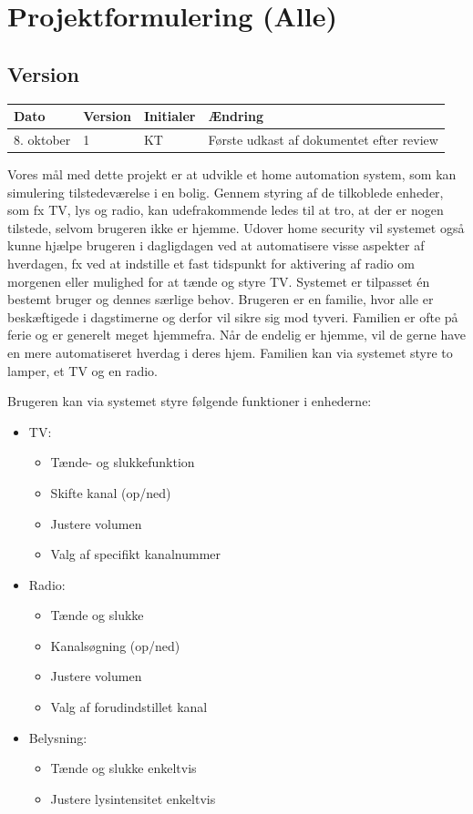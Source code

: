 \chapter{Projektformulering (Alle)}

\section{Version}
\begin{table}[h]
	\centering
	\begin{tabularx}{\textwidth}{|l|l| l|X|}
	\hline
	Dato	& Version	& Initialer & Ændring	\\ \hline
	8. oktober & 1 & KT	& Første udkast af dokumentet efter review \\ \hline
	\end{tabularx}
\end{table}

Vores mål med dette projekt er at udvikle et home automation system, som kan simulering tilstedeværelse i en bolig. Gennem styring af de tilkoblede enheder, som fx TV, lys og radio, kan udefrakommende ledes til at tro, at der er nogen tilstede, selvom brugeren ikke er hjemme. Udover home security vil systemet også kunne hjælpe brugeren i dagligdagen ved at automatisere visse aspekter af hverdagen, fx ved at indstille et fast tidspunkt for aktivering af radio om morgenen eller mulighed for at tænde og styre TV. Systemet er tilpasset én bestemt bruger og dennes særlige behov. Brugeren er en familie, hvor alle er beskæftigede i dagstimerne og derfor vil sikre sig mod tyveri. Familien er ofte på ferie og er generelt meget hjemmefra. Når de endelig er hjemme, vil de gerne have en mere automatiseret hverdag i deres hjem. Familien kan via systemet styre to lamper, et TV og en radio. 

Brugeren kan via systemet styre følgende funktioner i enhederne:
\begin{itemize}
\item TV:
\begin{itemize}
\item Tænde- og slukkefunktion
\item Skifte kanal (op/ned)
\item Justere volumen 
\item Valg af specifikt kanalnummer
\end{itemize}

\item Radio:
\begin{itemize}
\item Tænde og slukke
\item Kanalsøgning (op/ned)
\item Justere volumen
\item Valg af forudindstillet kanal
\end{itemize}

\item Belysning:
\begin{itemize}
\item Tænde og slukke enkeltvis
\item Justere lysintensitet enkeltvis
\end{itemize}
\end{itemize}


